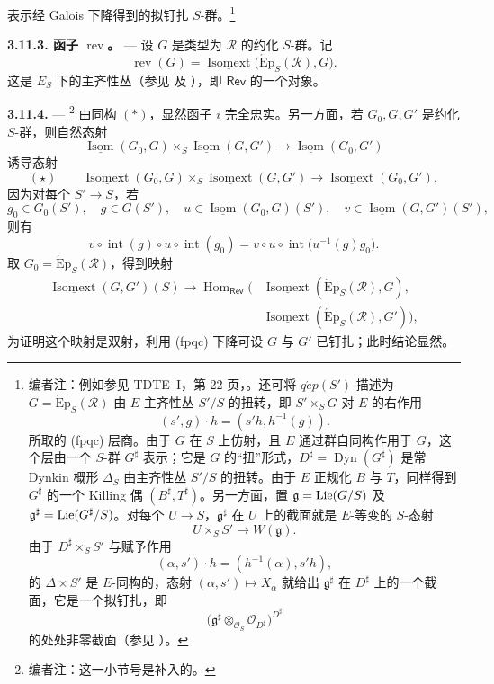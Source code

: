 表示经 Galois 下降得到的拟钉扎 \(S\)-群。\footnote{编者注：例如参见 TDTE~I，第 22 页，。还可将 \(q\acute{e}p(S')\) 描述为 \(G=\operatorname{\acute{E}p}_S(\mathscr R)\) 由 \(E\)-主齐性丛 \(S'/S\) 的扭转，即 \(S'\times_SG\) 对 \(E\) 的右作用
\[
  (s',g)\cdot h=(s'h,h^{-1}(g)).
\]
所取的 \textup{(fpqc)} 层商。由于 \(G\) 在 \(S\) 上仿射，且 \(E\) 通过群自同构作用于 \(G\)，这个层由一个 \(S\)-群 \(G^\sharp\) 表示；它是 \(G\) 的“扭”形式，\(D^\sharp=\operatorname{Dyn}(G^\sharp)\) 是常 Dynkin 概形 \(\Delta_S\) 由主齐性丛 \(S'/S\) 的扭转。由于 \(E\) 正规化 \(B\) 与 \(T\)，同样得到 \(G^\sharp\) 的一个 Killing 偶 \((B^\sharp,T^\sharp)\)。另一方面，置 \(\mathfrak g=\operatorname{Lie}(G/S)\) 及 \(\mathfrak g^\sharp=\operatorname{Lie}(G^\sharp/S)\)。对每个 \(U\to S\)，\(\mathfrak g^\sharp\) 在 \(U\) 上的截面就是 \(E\)-等变的 \(S\)-态射
\[
  U\times_SS'\longrightarrow W(\mathfrak g).
\]
由于 \(D^\sharp\times_SS'\) 与赋予作用
\[
  (\alpha,s')\cdot h=(h^{-1}(\alpha),s'h),
\]
的 \(\Delta\times S'\) 是 \(E\)-同构的，态射 \((\alpha,s')\mapsto X_\alpha\) 就给出 \(\mathfrak g^\sharp\) 在 \(D^\sharp\) 上的一个截面，它是一个拟钉扎，即
\[
  \bigl(
    \mathfrak g^\sharp\otimes_{\mathcal O_S}\mathcal O_{D^\sharp}
  \bigr)^{D^\sharp}
\]
的处处非零截面（参见 ）。}

\medskip\noindent\textbf{3.11.3. 函子 \(\operatorname{rev}\)。} ---
设 \(G\) 是类型为 \(\mathscr R\) 的约化 \(S\)-群。记
\[
  \operatorname{rev}(G)
  =
  \underline{\operatorname{Isomext}}
    \bigl(\operatorname{\acute{E}p}_S(\mathscr R),G\bigr).
\]
这是 \(E_S\) 下的主齐性丛（参见  及 ），即 \(\mathsf{Rev}\) 的一个对象。

\medskip\noindent\textbf{3.11.4.} ---
\footnote{编者注：这一小节号是补入的。}
由同构  \((*)\)，显然函子 \(i\) 完全忠实。另一方面，若 \(G_0,G,G'\) 是约化 \(S\)-群，则自然态射
\[
  \underline{\operatorname{Isom}}(G_0,G)
  \times_S
  \underline{\operatorname{Isom}}(G,G')
  \longrightarrow
  \underline{\operatorname{Isom}}(G_0,G')
\]
诱导态射
\[
  (\star)\qquad
  \underline{\operatorname{Isomext}}(G_0,G)
  \times_S
  \underline{\operatorname{Isomext}}(G,G')
  \longrightarrow
  \underline{\operatorname{Isomext}}(G_0,G'),
\]
因为对每个 \(S'\to S\)，若
\[
  g_0\in G_0(S'),\quad g\in G(S'),\quad
  u\in\underline{\operatorname{Isom}}(G_0,G)(S'),\quad
  v\in\underline{\operatorname{Isom}}(G,G')(S'),
\]
则有
\[
  v\circ\operatorname{int}(g)\circ u\circ\operatorname{int}(g_0)
  =
  v\circ u\circ
  \operatorname{int}\bigl(u^{-1}(g)g_0\bigr).
\]
取 \(G_0=\operatorname{\acute{E}p}_S(\mathscr R)\)，得到映射
\[
\begin{aligned}
  \underline{\operatorname{Isomext}}(G,G')(S)
  \longrightarrow
  \operatorname{Hom}_{\mathsf{Rev}}\bigl(
  &\underline{\operatorname{Isomext}}
    (\operatorname{\acute{E}p}_S(\mathscr R),G),\\
  &\underline{\operatorname{Isomext}}
    (\operatorname{\acute{E}p}_S(\mathscr R),G')
  \bigr),
\end{aligned}
\]
为证明这个映射是双射，利用 \textup{(fpqc)} 下降可设 \(G\) 与 \(G'\) 已钉扎；此时结论显然。

